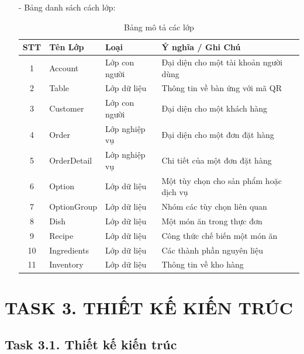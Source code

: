 \documentclass[a4paper]{article}
\begin{document}
    \begin{itemize}
        \item[-] Bảng danh sách cách lớp:
            \begin{table}[h!]
            \centering
            \begin{tabular}{|c|l|l|l|}
            \hline
            STT & Tên Lớp & Loại & Ý nghĩa / Ghi Chú \\
            \hline
            1 & Account & Lớp con người & Đại diện cho một tài khoản người dùng \\
            \hline
            2 & Table & Lớp dữ liệu & Thông tin về bàn ứng với mã QR \\
            \hline
            3 & Customer & Lớp con người & Đại diện cho một khách hàng \\
            \hline
            4 & Order & Lớp nghiệp vụ & Đại diện cho một đơn đặt hàng \\
            \hline
            5 & OrderDetail & Lớp nghiệp vụ & Chi tiết của một đơn đặt hàng \\
            \hline
            6 & Option & Lớp dữ liệu & Một tùy chọn cho sản phẩm hoặc dịch vụ \\
            \hline
            7 & OptionGroup & Lớp dữ liệu & Nhóm các tùy chọn liên quan \\
            \hline
            8 & Dish & Lớp dữ liệu & Một món ăn trong thực đơn \\
            \hline
            9 & Recipe & Lớp dữ liệu & Công thức chế biến một món ăn \\
            \hline
            10 & Ingredients & Lớp dữ liệu & Các thành phần nguyên liệu \\
            \hline
            11 & Inventory & Lớp dữ liệu & Thông tin về kho hàng \\
            \hline
            \end{tabular}
            \caption{Bảng mô tả các lớp}
            \label{tab:cac_lop}
            \end{table}
    \end{itemize}

\newpage
\section{TASK 3. THIẾT KẾ KIẾN TRÚC}

\subsection{Task 3.1. Thiết kế kiến trúc}
\end{document}

